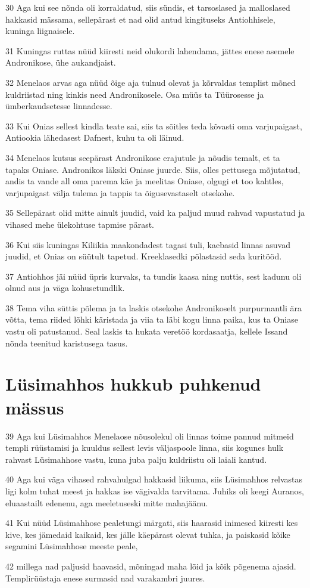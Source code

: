 \par 30 Aga kui see nõnda oli korraldatud, siis sündis, et tarsoslased ja malloslased hakkasid mässama, sellepärast et nad olid antud kingituseks Antiohhisele, kuninga liignaisele.
\par 31 Kuningas ruttas nüüd kiiresti neid olukordi lahendama, jättes enese asemele Andronikose, ühe aukandjaist.
\par 32 Menelaos arvas aga nüüd õige aja tulnud olevat ja kõrvaldas templist mõned kuldriistad ning kinkis need Andronikosele. Osa müüs ta Tüürosesse ja ümberkaudsetesse linnadesse.
\par 33 Kui Onias sellest kindla teate sai, siis ta sõitles teda kõvasti oma varjupaigast, Antiookia lähedasest Dafnest, kuhu ta oli läinud.
\par 34 Menelaos kutsus seepärast Andronikose erajutule ja nõudis temalt, et ta tapaks Oniase. Andronikos läkski Oniase juurde. Siis, olles pettusega mõjutatud, andis ta vande all oma parema käe ja meelitas Oniase, olgugi et too kahtles, varjupaigast välja tulema ja tappis ta õigusevastaselt otsekohe.
\par 35 Sellepärast olid mitte ainult juudid, vaid ka paljud muud rahvad vapustatud ja vihased mehe ülekohtuse tapmise pärast.
\par 36 Kui siis kuningas Kiliikia maakondadest tagasi tuli, kaebasid linnas asuvad juudid, et Onias on süütult tapetud. Kreeklasedki põlastasid seda kuritööd.
\par 37 Antiohhos jäi nüüd üpris kurvaks, ta tundis kaasa ning nuttis, sest kadunu oli olnud aus ja väga kohusetundlik.
\par 38 Tema viha süttis põlema ja ta laskis otsekohe Andronikoselt purpurmantli ära võtta, tema riided lõhki käristada ja viia ta läbi kogu linna paika, kus ta Oniase vastu oli patustanud. Seal laskis ta hukata veretöö kordasaatja, kellele Issand nõnda teenitud karistusega tasus.


\section*{Lüsimahhos hukkub puhkenud mässus}

\par 39 Aga kui Lüsimahhos Menelaose nõusolekul oli linnas toime pannud mitmeid templi rüüstamisi ja kuuldus sellest levis väljaspoole linna, siis kogunes hulk rahvast Lüsimahhose vastu, kuna juba palju kuldriistu oli laiali kantud.
\par 40 Aga kui väga vihased rahvahulgad hakkasid liikuma, siis Lüsimahhos relvastas ligi kolm tuhat meest ja hakkas ise vägivalda tarvitama. Juhiks oli keegi Auranos, eluaastailt edenenu, aga meeletuseski mitte mahajäänu.
\par 41 Kui nüüd Lüsimahhose pealetungi märgati, siis haarasid inimesed kiiresti kes kive, kes jämedaid kaikaid, kes jälle käepärast olevat tuhka, ja paiskasid kõike segamini Lüsimahhose meeste peale,
\par 42 millega nad paljusid haavasid, mõningad maha lõid ja kõik põgenema ajasid. Templirüüstaja enese surmasid nad varakambri juures.


